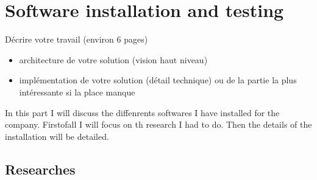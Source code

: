 
\section{Software installation and testing}

Décrire votre travail (environ 6 pages)
\begin{itemize}
	\item architecture de votre solution (vision haut niveau)
	\item implémentation de votre solution (détail technique) ou de la partie la plus intéressante si la place manque

\end{itemize}

In this part I will discuss the diffenrents softwares I have installed for the company. Firstofall I will focus on th research I had to do. Then the details of the installation will be detailed. 
\subsection{Researches}

